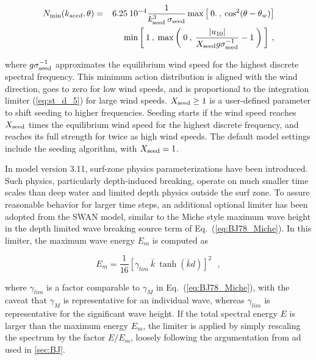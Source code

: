 
\begin{eqnarray}
N_{\min}(k_{seed},\theta) & = & 
        6.25 \: 10^{-4} \frac{1}{k_{\rm seed}^3 \: \sigma_{\rm seed}}
        \max \left [ \: 0. \: , \: \cos^2 ( \theta - \theta_w ) \right ]
                             \nonumber \\ & & \hspace{5mm}
        \min \left [ \: 1 \: , \: \max \left ( \: 0 \: , \: 
        \frac{|u_{10}|}{X_{\rm seed} g \sigma_{\rm seed}^{-1}}-1 
\: \right ) \: \right ] \: , \label{eq:seed} \end{eqnarray}

\noindent
where $g \sigma_{\rm seed}^{-1}$ approximates the equilibrium wind speed for
the highest discrete spectral frequency. This minimum action distribution is
aligned with the wind direction, goes to zero for low wind speeds, and is
proportional to the integration limiter (\ref{eq:st_d_5}) for large wind
speeds. $X_{\rm seed} \geq 1$ is a user-defined parameter to shift seeding to
higher frequencies. Seeding starts if the wind speed reaches $X_{\rm seed}$
times the equilibrium wind speed for the highest discrete frequency, and
reaches its full strength for twice as high wind speeds. The default model
settings include the seeding algorithm, with $X_{\rm seed} = 1$.

In model version 3.11, surf-zone physics parameterizations have been
introduced. Such physics, particularly depth-induced breaking, operate on much
smaller time scales than deep water and limited depth physics outside the surf
zone. To assure reasonable behavior for larger time steps, an additional
optional limiter has been adopted from the SWAN model, similar to the Miche
style maximum wave height in the depth limited wave breaking source term of
Eq.~(\ref{eq:BJ78_Miche}). In this limiter, the maximum wave energy $E_m$ is
computed as


\begin{equation}
E_m = \frac{1}{16} [ \gamma_{lim} \:\bar{k} \: \tanh ( \bar{k} d ) ] ^2
\:\:\: , \label{eq:MLIM} 
\end{equation}

\noindent
where $\gamma_{lim}$ is a factor comparable to $\gamma_M$ in
Eq.~(\ref{eq:BJ78_Miche}), with the caveat that $\gamma_M$ is representative
for an individual wave, whereas $\gamma_{lim}$ is representative for the
significant wave height. If the total spectral energy $E$ is larger than the
maximum energy $E_m$, the limiter is applied by simply rescaling the spectrum
by the factor $E/E_m$, loosely following the argumentation from
\cite{art:EB96} ad used in \para\ref{sec:BJ}. 

